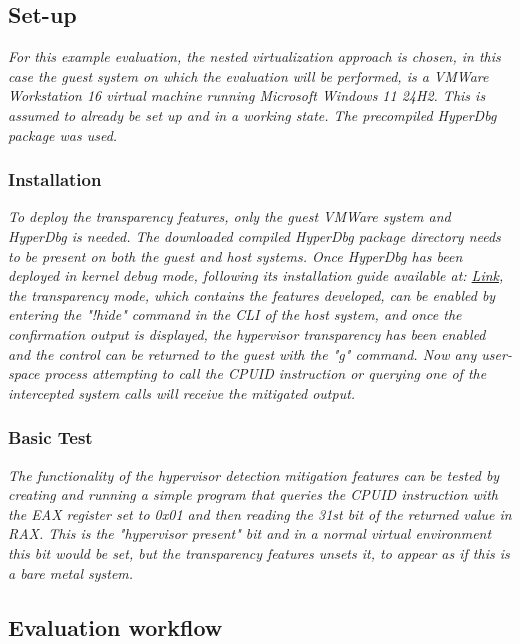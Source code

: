 \subsection{Set-up}

\textit{For this example evaluation, the nested virtualization approach is chosen, in this case the guest system on which the evaluation will be performed,
is a VMWare Workstation 16 virtual machine running Microsoft Windows 11 24H2. This is assumed to already be set up and in a working state. The precompiled HyperDbg package was used.}

\subsubsection{Installation}
\textit{To deploy the transparency features, only the guest VMWare system and HyperDbg is needed. The downloaded compiled HyperDbg package directory needs to be present on both the guest and host systems. 
Once HyperDbg has been deployed in kernel debug mode, following its installation guide available at: \href{https://docs.hyperdbg.org/getting-started/build-and-install}{Link}, the transparency mode, 
which contains the features developed, can be enabled by entering the "!hide" command in the CLI of the host system, and once the confirmation output is displayed, the hypervisor transparency has been enabled 
and the control can be returned to the guest with the "g" command. Now any user-space process attempting to call the CPUID instruction or querying one of the intercepted system calls 
will receive the mitigated output.}

\subsubsection{Basic Test}
\textit{The functionality of the hypervisor detection mitigation features can be tested by creating and running a simple program that queries the CPUID instruction with the EAX register set to 0x01
 and then reading the 31st bit of the returned value in RAX. This is the "hypervisor present" bit and in a normal virtual environment this bit would be set, but the transparency features unsets it, 
 to appear as if this is a bare metal system.}

\subsection{Evaluation workflow}

